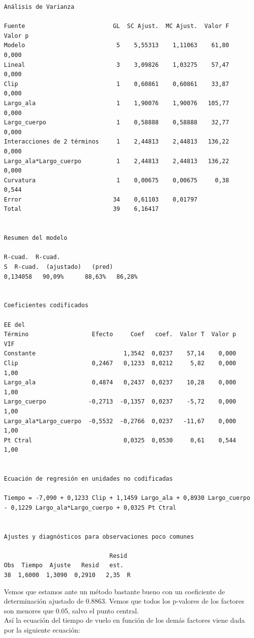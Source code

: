 \documentclass[12pt,a4paper,twoside,openright,titlepage,final]{article}
\begin{document}
\begin{verbatim}
Análisis de Varianza

Fuente                         GL  SC Ajust.  MC Ajust.  Valor F  Valor p
Modelo                          5    5,55313    1,11063    61,80    0,000
Lineal                          3    3,09826    1,03275    57,47    0,000
Clip                            1    0,60861    0,60861    33,87    0,000
Largo_ala                       1    1,90076    1,90076   105,77    0,000
Largo_cuerpo                    1    0,58888    0,58888    32,77    0,000
Interacciones de 2 términos     1    2,44813    2,44813   136,22    0,000
Largo_ala*Largo_cuerpo          1    2,44813    2,44813   136,22    0,000
Curvatura                       1    0,00675    0,00675     0,38    0,544
Error                          34    0,61103    0,01797
Total                          39    6,16417


Resumen del modelo

R-cuad.  R-cuad.
S  R-cuad.  (ajustado)   (pred)
0,134058   90,09%      88,63%   86,28%


Coeficientes codificados

EE del
Término                  Efecto     Coef   coef.  Valor T  Valor p   VIF
Constante                         1,3542  0,0237    57,14    0,000
Clip                     0,2467   0,1233  0,0212     5,82    0,000  1,00
Largo_ala                0,4874   0,2437  0,0237    10,28    0,000  1,00
Largo_cuerpo            -0,2713  -0,1357  0,0237    -5,72    0,000  1,00
Largo_ala*Largo_cuerpo  -0,5532  -0,2766  0,0237   -11,67    0,000  1,00
Pt Ctral                          0,0325  0,0530     0,61    0,544  1,00


Ecuación de regresión en unidades no codificadas

Tiempo = -7,090 + 0,1233 Clip + 1,1459 Largo_ala + 0,8930 Largo_cuerpo
- 0,1229 Largo_ala*Largo_cuerpo + 0,0325 Pt Ctral


Ajustes y diagnósticos para observaciones poco comunes

                              Resid
Obs  Tiempo  Ajuste   Resid   est.
38  1,6000  1,3090  0,2910   2,35  R
\end{verbatim}

Vemos que estamos ante un método bastante bueno con un coeficiente de determinación ajustado de 0.8863. Vemos que todos los p-valores de los factores son menores que 0.05, salvo el punto central.\\

Así la ecuación del tiempo de vuelo en función de los demás factores viene dada por la siguiente ecuación:
\end{document}
